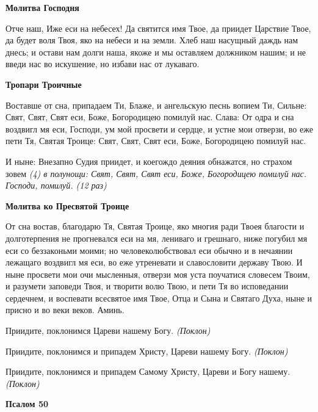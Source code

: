 \medskip
\bfseries Молитва Господня\normalfont{}\nopagebreak


Отче наш, Иже еси на небесех! Да святится имя Твое, да приидет Царствие Твое, да будет воля Твоя, яко на небеси и на земли. Хлеб наш насущный даждь нам днесь; и остави нам долги наша, якоже и мы оставляем должником нашим; и не введи нас во искушение, но избави нас от лукаваго.




\medskip
\bfseries Тропари Троичные\normalfont{}\nopagebreak


Воставше от сна, припадаем Ти, Блаже, и ангельскую песнь вопием Ти, Сильне: Свят, Свят, Свят еси, Боже, Богородицею помилуй нас.
Слава: От одра и сна воздвигл мя еси, Господи, ум мой просвети и сердце, и устне мои отверзи, во еже пети Тя, Святая Троице: Свят, Свят, Свят еси, Боже, Богородицею помилуй нас. 



И ныне: Внезапно Судия приидет, и коегождо деяния обнажатся, но страхом зовем \itshape (4)\normalfont{} в полунощи: Свят, Свят, Свят еси, Боже, Богородицею помилуй нас.
Господи, помилуй. \itshape (12 раз)\normalfont{}


\medskip
\bfseries Молитва ко Пресвятой Троице\normalfont{}\nopagebreak


От сна востав, благодарю Тя, Святая Троице, яко многия ради Твоея благости и долготерпения не прогневался еси на мя, лениваго и грешнаго, ниже погубил мя еси со беззаконьми моими; но человеколюбствовал еси обычно и в нечаянии лежащаго воздвигл мя еси, во еже утреневати и славословити державу Твою. И ныне просвети мои очи мысленныя, отверзи моя уста поучатися словесем Твоим, и разумети заповеди Твоя, и творити волю Твою, и пети Тя во исповедании сердечнем, и воспевати всесвятое имя Твое, Отца и Сына и Святаго Духа, ныне и присно и во веки веков. Аминь.


Приидите, поклонимся Цареви нашему Богу. \itshape (Поклон)\normalfont{}


Приидите, поклонимся и припадем Христу, Цареви нашему Богу. \itshape (Поклон)\normalfont{} 


Приидите, поклонимся и припадем Самому Христу, Цареви и Богу нашему. \itshape (Поклон)\normalfont{}


\medskip
\bfseries Псалом 50\normalfont{}\nopagebreak


